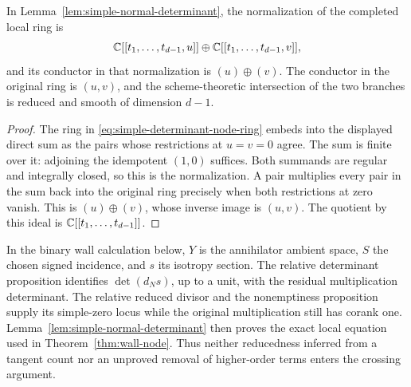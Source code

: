 \begin{corollary}
\label{cor:intrinsic-node-conductor}
In Lemma~\ref{lem:simple-normal-determinant}, the normalization of
the completed local ring is
\[
 \mathbb C[[t_1,\ldots,t_{d-1},u]]\oplus
 \mathbb C[[t_1,\ldots,t_{d-1},v]],
\]
and its conductor in that normalization is $(u)\oplus(v)$.
The conductor in the original ring is $(u,v)$, and the
scheme-theoretic intersection of the two branches is reduced and
smooth of dimension $d-1$.
\end{corollary}
\begin{proof}
The ring in \eqref{eq:simple-determinant-node-ring} embeds into the
displayed direct sum as the pairs whose restrictions at $u=v=0$
agree. The sum is finite over it: adjoining the idempotent $(1,0)$
suffices. Both summands are regular and integrally closed, so this
is the normalization. A pair multiplies every pair in the sum back
into the original ring precisely when both restrictions at zero
vanish. This is $(u)\oplus(v)$, whose inverse image is $(u,v)$.
The quotient by this ideal is $\mathbb C[[t_1,\ldots,t_{d-1}]]$.
\end{proof}

In the binary wall calculation below, $Y$ is the annihilator ambient
space, $S$ the chosen signed incidence, and $s$ its isotropy section.
The relative determinant proposition identifies $\det(d_Ns)$,
up to a unit, with the residual multiplication determinant. The
relative reduced divisor and the nonemptiness proposition supply
its simple-zero locus while the original multiplication still has
corank one. Lemma~\ref{lem:simple-normal-determinant} then proves
the exact local equation used in Theorem~\ref{thm:wall-node}.
Thus neither reducedness inferred from a tangent count nor an
unproved removal of higher-order terms enters the crossing argument.
